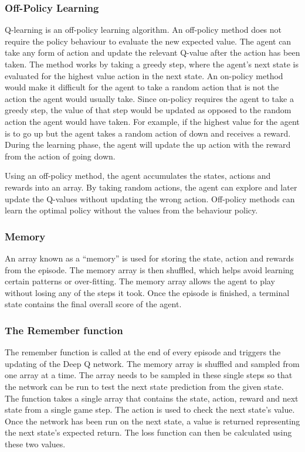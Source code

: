 \subsubsection{Off-Policy Learning}

Q-learning is an off-policy learning algorithm. An off-policy method does not
require the policy behaviour to evaluate the new expected value. The agent can
take any form of action and update the relevant Q-value after the action
has been taken. The method works by taking a greedy step, where the agent's next
state is evaluated for the highest value action in the next state. An on-policy
method would make it difficult for the agent to take a random action that is not
the action the agent would usually take. Since on-policy requires the agent to
take a greedy step, the value of that step would be updated as opposed to the
random action the agent would have taken. For example, if the highest value for
the agent is to go up but the agent takes a random action of down and receives a
reward. During the learning phase, the agent will update the up action with the
reward from the action of going down.

Using an off-policy method, the agent accumulates the states, actions and
rewards into an array. By taking random actions, the agent can explore and later
update the Q-values without updating the wrong action. Off-policy methods can
learn the optimal policy without the values from the behaviour policy.

\subsubsection{Memory}

An array known as a ``memory'' is used for storing the state, action and rewards
from the episode. The memory array is then shuffled, which helps avoid learning
certain patterns or over-fitting. The memory array allows the agent to play
without losing any of the steps it took. Once the episode is finished, a
terminal state contains the final overall score of the agent.

\subsubsection{The Remember function}

The remember function is called at the end of every episode and triggers the
updating of the Deep Q network. The memory array is shuffled and sampled from one
array at a time. The array needs to be sampled in these single steps so that the
network can be run to test the next state prediction from the given state. The
function takes a single array that contains the state, action, reward and next
state from a single game step. The action is used to check the next state's
value. Once the network has been run on the next state, a value is returned
representing the next state's expected return. The loss function can then be
calculated using these two values.

